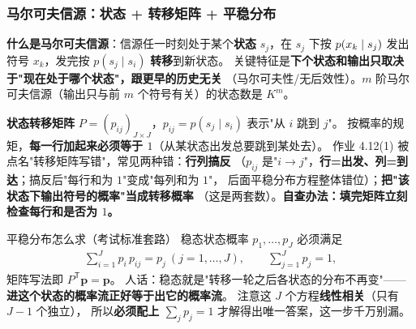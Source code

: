 \subsubsection{马尔可夫信源：状态 + 转移矩阵 + 平稳分布}
\textbf{什么是马尔可夫信源}：信源任一时刻处于某个\textbf{状态} $s_j$，在 $s_j$ 下按
$p\!\left(x_k\mid s_j\right)$ 发出符号 $x_k$，发完按 $p(s_j\mid s_i)$ \textbf{转移}到新状态。
关键特征是\textbf{下个状态和输出只取决于"现在处于哪个状态"，跟更早的历史无关}
（马尔可夫性/无后效性）。$m$ 阶马尔可夫信源（输出只与前 $m$ 个符号有关）的状态数是 $K^m$。

\textbf{状态转移矩阵} $P=(p_{ij})_{J\times J}$，$p_{ij}=p(s_j\mid s_i)$ 表示"从 $i$ 跳到 $j$"。
按概率的规矩，\textbf{每一行加起来必须等于 $1$}（从某状态出发总要跳到某处去）。
作业 4.12(1) 被点名"转移矩阵写错"，常见两种错：\textbf{行列搞反}
（$p_{ij}$ 是"$i\to j$"，\textbf{行=出发、列=到达}；搞反后"每行和为 $1$"变成"每列和为 $1$"，
后面平稳分布方程整体错位）；\textbf{把"该状态下输出符号的概率"当成转移概率}
（这是两套数）。\textbf{自查办法：填完矩阵立刻检查每行和是否为 $1$。}

\begin{defbox}{平稳分布怎么求（考试标准套路）}
稳态状态概率 $p_1,\dots,p_J$ 必须满足
\begin{align*}
\sum_{i=1}^{J}p_i\,p_{ij}=p_j\ (j=1,\dots,J),\qquad \sum_{j=1}^{J}p_j=1,
\end{align*}
矩阵写法即 $P^{\mathsf T}\boldsymbol p=\boldsymbol p$。
人话：稳态就是"转移一轮之后各状态的分布不再变"——\textbf{进这个状态的概率流正好等于出它的概率流}。
注意这 $J$ 个方程\textbf{线性相关}（只有 $J-1$ 个独立），
所以\textbf{必须配上 $\sum_jp_j=1$} 才解得出唯一答案，这一步千万别漏。
\end{defbox}

